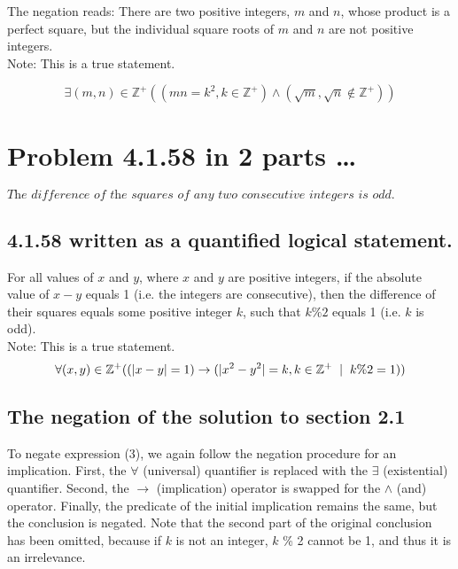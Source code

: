 \documentclass[12pt]{article}
\begin{document}
The negation reads: There are two positive integers, $m$ and $n$, whose product is a perfect square, but the individual square roots of $m$ and $n$ are not positive integers. \\

Note: This is a true statement.

\begin{equation}
\exists (m,n) \in \mathbb{Z}^+ ((mn = k^2, k \in \mathbb{Z}^+) \land (\sqrt{m}, \sqrt{n} \notin \mathbb{Z}^+ ))
\end{equation}


\section{Problem 4.1.58 in 2 parts \ldots}
\bigskip
$\textit{The difference of the squares of any two consecutive integers is odd.}$

\subsection{4.1.58 written as a quantified logical statement.}
\bigskip

For all values of $x$ and $y$, where $x$ and $y$ are positive integers, if the absolute value of $x - y$ equals 1 (i.e. the integers are consecutive), then the difference of their squares equals some positive integer $k$, such that $k \% 2$ equals 1 (i.e. $k$ is odd). \\

Note: This is a true statement.\\

\begin{equation}
\forall (x,y) \in \mathbb{Z}^+((|x-y| = 1) \rightarrow (|x^2 - y^2| = k, k \in \mathbb{Z}^+ \hspace{0.2cm}| \hspace{0.2cm}k \% 2 = 1))
\end{equation}

\bigskip
\subsection{The negation of the solution to section 2.1}
\bigskip

To negate expression (3), we again follow the negation procedure for an implication. First, the $\forall$ (universal) quantifier is replaced with the $\exists$ (existential) quantifier. Second, the $\rightarrow$ (implication) operator is swapped for the $\land$ (and) operator. Finally, the predicate of the initial implication remains the same, but the conclusion is negated. Note that the second part of the original conclusion has been omitted, because if $k$ is not an integer, $k$ \% 2 cannot be 1, and thus it is an irrelevance. \\
\end{document}
